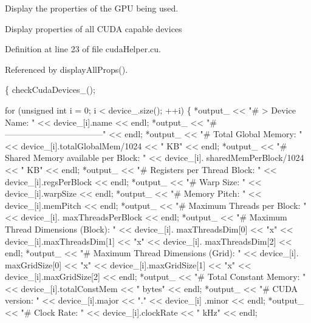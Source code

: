 Display the properties of the G\-P\-U being used. 

Display properties of all C\-U\-D\-A capable devices 

Definition at line 23 of file cuda\-Helper.\-cu.



Referenced by display\-All\-Props().


\begin{DoxyCode}
                                             \{
    checkCudaDevices\_();
    
    \textcolor{keywordflow}{for} (\textcolor{keywordtype}{unsigned} \textcolor{keywordtype}{int} i = 0; i < device\_.size(); ++i) \{
        *output\_ << \textcolor{stringliteral}{"# > Device Name: "} <<  device\_[i].name << endl;
        *output\_ << \textcolor{stringliteral}{"# -----------------------------------"} << endl;
        *output\_ << \textcolor{stringliteral}{"# Total Global Memory: "} << device\_[i].totalGlobalMem/1024
       << \textcolor{stringliteral}{" KB"} << endl;
        *output\_ << \textcolor{stringliteral}{"# Shared Memory available per Block: "} << device\_[i].
      sharedMemPerBlock/1024 << \textcolor{stringliteral}{" KB"} << endl;
        *output\_ << \textcolor{stringliteral}{"# Registers per Thread Block: "} << device\_[i].regsPerBlock
       << endl;
        *output\_ << \textcolor{stringliteral}{"# Warp Size: "} << device\_[i].warpSize << endl;
        *output\_ << \textcolor{stringliteral}{"# Memory Pitch: "} << device\_[i].memPitch << endl;
        *output\_ << \textcolor{stringliteral}{"# Maximum Threads per Block: "} << device\_[i].
      maxThreadsPerBlock << endl;
        *output\_ << \textcolor{stringliteral}{"# Maximum Thread Dimensions (Block): "} << device\_[i].
      maxThreadsDim[0] << \textcolor{stringliteral}{"x"} << device\_[i].maxThreadsDim[1] << \textcolor{stringliteral}{"x"} << device\_[i].
      maxThreadsDim[2] << endl;
        *output\_ << \textcolor{stringliteral}{"# Maximum Thread Dimensions (Grid): "} << device\_[i].
      maxGridSize[0] << \textcolor{stringliteral}{"x"} << device\_[i].maxGridSize[1] << \textcolor{stringliteral}{"x"} << device\_[i].maxGridSize[2]
       << endl;
        *output\_ << \textcolor{stringliteral}{"# Total Constant Memory: "} << device\_[i].totalConstMem << \textcolor{stringliteral}{
      " bytes"} << endl;
        *output\_ << \textcolor{stringliteral}{"# CUDA version: "} << device\_[i].major << \textcolor{stringliteral}{"."} << device\_[i]
      .minor << endl;
        *output\_ << \textcolor{stringliteral}{"# Clock Rate: "} << device\_[i].clockRate << \textcolor{stringliteral}{" kHz"} << endl;

\end{DoxyCode}
